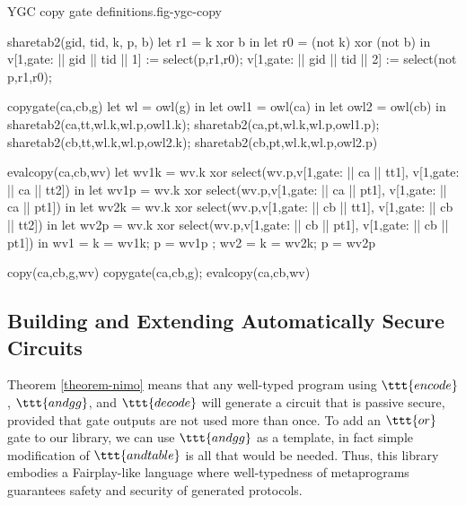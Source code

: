 \begin{fpfig}[t]{YGC copy gate definitions.}{fig-ygc-copy}
  {\footnotesize
    \begin{verbatimtab}
      sharetab2(gid, tid, k, p, b)
      {
        let r1 = k xor b in
        let r0 = (not k) xor (not b) in
        v[1,gate: || gid || tid || 1] := select(p,r1,r0);
        v[1,gate: || gid || tid || 2] := select(not p,r1,r0);
      }
      
      copygate(ca,cb,g)
      {
        let wl = owl(g) in
        let owl1 = owl(ca) in
        let owl2 = owl(cb) in
        sharetab2(ca,tt,wl.k,wl.p,owl1.k); sharetab2(ca,pt,wl.k,wl.p,owl1.p);
        sharetab2(cb,tt,wl.k,wl.p,owl2.k); sharetab2(cb,pt,wl.k,wl.p,owl2.p)
      }
      
      evalcopy(ca,cb,wv)
      {
        let wv1k = wv.k xor select(wv.p,v[1,gate: || ca || tt1], v[1,gate: || ca || tt2]) in
        let wv1p = wv.k xor select(wv.p,v[1,gate: || ca || pt1], v[1,gate: || ca || pt1]) in
        let wv2k = wv.k xor select(wv.p,v[1,gate: || cb || tt1], v[1,gate: || cb || tt2]) in
        let wv2p = wv.k xor select(wv.p,v[1,gate: || cb || pt1], v[1,gate: || cb || pt1]) in
        { wv1 = { k = wv1k; p = wv1p }; wv2 = { k = wv2k; p = wv2p } }  
      }

      copy(ca,cb,g,wv) { copygate(ca,cb,g); evalcopy(ca,cb,wv) } 
    \end{verbatimtab}
  }
\end{fpfig}

\subsection{Building and Extending Automatically Secure Circuits}
\label{section-composition-copy}

Theorem \ref{theorem-nimo} means that any well-typed program using
$\ttt{encode}$, $\ttt{andgg}$, and $\ttt{decode}$ will generate a
circuit that is passive secure, provided that gate outputs are not
used more than once. To add an $\ttt{or}$ gate to our library, we can
use $\ttt{andgg}$ as a template, in fact simple modification of
$\ttt{andtable}$ is all that would be needed. Thus, this library
embodies a Fairplay-like language where well-typedness of metaprograms
guarantees safety and security of generated protocols.

